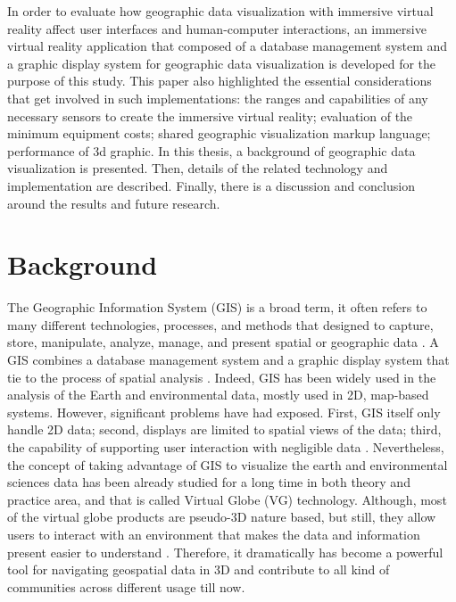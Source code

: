 In order to evaluate how geographic data visualization with immersive virtual reality affect user interfaces and human-computer interactions, an immersive virtual reality application that composed of a database management system and a graphic display system for geographic data visualization is developed for the purpose of this study. This paper also highlighted the essential considerations that get involved in such implementations: the ranges and capabilities of any necessary sensors to create the immersive virtual reality; evaluation of the minimum equipment costs; shared geographic visualization markup language; performance of 3d graphic. In this thesis, a background of geographic data visualization is presented. Then, details of the related technology and implementation are described. Finally, there is a discussion and conclusion around the results and future research.

\section{Background}
\label{section:background}

The Geographic Information System (GIS) is a broad term, it often refers to many different technologies, processes, and methods that designed to capture, store, manipulate, analyze, manage, and present spatial or geographic data \cite{wiki.gis.2016}. A GIS combines a database management system and a graphic display system that tie to the process of spatial analysis \cite{rhyne.virtual.1997}. Indeed, GIS has been widely used in the analysis of the Earth and environmental data, mostly used in 2D, map-based systems. However, significant problems have had exposed. First, GIS itself only handle 2D data; second, displays are limited to spatial views of the data; third, the capability of supporting user interaction with negligible data \cite{rhyne.visualization-gis.1994}. Nevertheless, the concept of taking advantage of GIS to visualize the earth and environmental sciences data has been already studied for a long time in both theory and practice area, and that is called Virtual Globe (VG) technology. Although, most of the virtual globe products are pseudo-3D nature based, but still, they allow users to interact with an environment that makes the data and information present easier to understand \cite{tuttle.virtual-globes.2008}. Therefore, it dramatically has become a powerful tool for navigating geospatial data in 3D and contribute to all kind of communities across different usage till now. 

